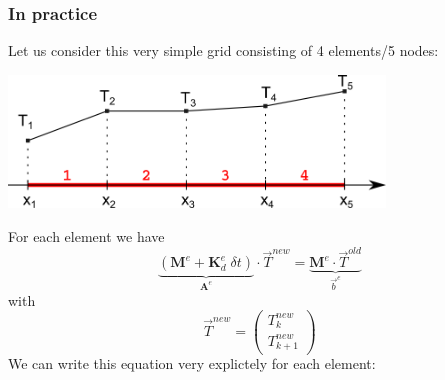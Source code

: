 \subsubsection{In practice}

Let us consider this very simple grid consisting of 4 elements/5 nodes:
\begin{center}
\includegraphics[width=10cm]{images/oneD/grid5}
\end{center}
For each element we have 
\[
\underbrace{( {\bm M}^e +  {\bm K}_d^e \; \delta t )}_{\bm A^{e}} \cdot {\vec T}^{new} =  \underbrace{{\bm M}^e \cdot  {\vec T}^{old} }_{\vec b^{e}}
\]
with 
\[
\vec{T}^{new}=
\left(
\begin{array}{c}
T_k^{new} \\ T_{k+1}^{new}
\end{array}
\right)
\]
We can write this equation very explictely for each element:
